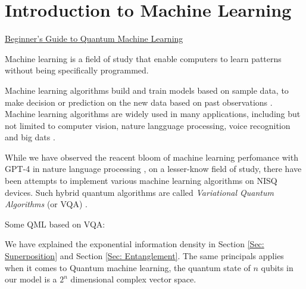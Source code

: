 \section{Introduction to Machine Learning} \label{Sec: Introduction to Machine Learning}

\href{https://blog.paperspace.com/beginners-guide-to-quantum-machine-learning/}{Beginner's Guide to Quantum Machine Learning}

\cite{kaurIntroductionMachineLearning2021}

Machine learning is a field of study that enable computers to learn patterns without being specifically programmed.

Machine learning algorithms build and train models based on sample data, to make decision or prediction on the new data based on past observations \cite{kozaAutomatedDesignBoth1996}.
Machine learning algorithms are widely used in many applications, including but not limited to computer vision, nature langguage processing, voice recognition and big dats \cite{khanMachineLearningComputer2020, zhangNaturalLanguageProcessing2021,tandelVoiceRecognitionVoice2020,elbouchefryLearningBigData2020, shindeReviewMachineLearning2018}.

While we have observed the reacent bloom of machine learning perfomance with GPT-4 in nature language processing \cite{openaiGPT4TechnicalReport2023}, on a lesser-know field of study, there have been attempts to implement various machine learning algorithms on NISQ devices.
Such hybrid quantum algorithms are called \emph{Variational Quantum Algorithms} (or VQA) \cite{cerezoVariationalQuantumAlgorithms2021}.

Some QML based on VQA: \cite{zoufalVariationalQuantumBoltzmann2021a, tillyVariationalQuantumEigensolver2021a}

We have explained the exponential information density in Section \ref{Sec: Superposition} and Section \ref{Sec: Entanglement}.
The same principals applies when it comes to Quantum machine learning, the quantum state of $n$ qubits in our model is a $2^n$ dimensional complex vector space.